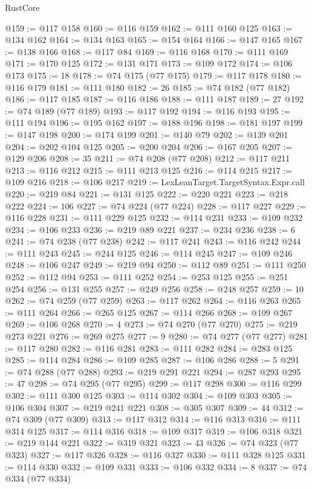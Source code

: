 \begin{lexlean}{RustCore}
\begin{coremodule}
@159 := @117 @158
@160 := @116 @159
@162 := @111 @160 @125
@163 := @134 @162
@164 := @134 @163
@165 := @154 @164
@166 := @147 @165
@167 := @138 @166
@168 := @117 @84
@169 := @116 @168
@170 := @111 @169
@171 := @170 @125
@172 := @131 @171
@173 := @109 @172
@174 := @106 @173
@175 := 18
@178 := @74 @175 (@77 @175)
@179 := @117 @178
@180 := @116 @179
@181 := @111 @180
@182 := 26
@185 := @74 @182 (@77 @182)
@186 := @117 @185
@187 := @116 @186
@188 := @111 @187
@189 := 27
@192 := @74 @189 (@77 @189)
@193 := @117 @192
@194 := @116 @193
@195 := @111 @194
@196 := @195 @162
@197 := @188 @196
@198 := @181 @197
@199 := @147 @198
@200 := @174 @199
@201 := @140 @79
@202 := @139 @201
@204 := @202 @104 @125
@205 := @200 @204
@206 := @167 @205
@207 := @129 @206
@208 := 35
@211 := @74 @208 (@77 @208)
@212 := @117 @211
@213 := @116 @212
@215 := @111 @213 @125
@216 := @114 @215
@217 := @109 @216
@218 := @106 @217
@219 := LexLeanTarget.TargetSyntax.Expr.call
@220 := @219 @84
@221 := @131 @125
@222 := @220 @221
@223 := @218 @222
@224 := 106
@227 := @74 @224 (@77 @224)
@228 := @117 @227
@229 := @116 @228
@231 := @111 @229 @125
@232 := @114 @231
@233 := @109 @232
@234 := @106 @233
@236 := @219 @89 @221
@237 := @234 @236
@238 := 6
@241 := @74 @238 (@77 @238)
@242 := @117 @241
@243 := @116 @242
@244 := @111 @243
@245 := @244 @125
@246 := @114 @245
@247 := @109 @246
@248 := @106 @247
@249 := @219 @94
@250 := @112 @89
@251 := @111 @250
@252 := @112 @94
@253 := @111 @252
@254 := @253 @125
@255 := @251 @254
@256 := @131 @255
@257 := @249 @256
@258 := @248 @257
@259 := 10
@262 := @74 @259 (@77 @259)
@263 := @117 @262
@264 := @116 @263
@265 := @111 @264
@266 := @265 @125
@267 := @114 @266
@268 := @109 @267
@269 := @106 @268
@270 := 4
@273 := @74 @270 (@77 @270)
@275 := @219 @273 @221
@276 := @269 @275
@277 := 9
@280 := @74 @277 (@77 @277)
@281 := @117 @280
@282 := @116 @281
@283 := @111 @282
@284 := @283 @125
@285 := @114 @284
@286 := @109 @285
@287 := @106 @286
@288 := 5
@291 := @74 @288 (@77 @288)
@293 := @219 @291 @221
@294 := @287 @293
@295 := 47
@298 := @74 @295 (@77 @295)
@299 := @117 @298
@300 := @116 @299
@302 := @111 @300 @125
@303 := @114 @302
@304 := @109 @303
@305 := @106 @304
@307 := @219 @241 @221
@308 := @305 @307
@309 := 44
@312 := @74 @309 (@77 @309)
@313 := @117 @312
@314 := @116 @313
@316 := @111 @314 @125
@317 := @114 @316
@318 := @109 @317
@319 := @106 @318
@321 := @219 @144 @221
@322 := @319 @321
@323 := 43
@326 := @74 @323 (@77 @323)
@327 := @117 @326
@328 := @116 @327
@330 := @111 @328 @125
@331 := @114 @330
@332 := @109 @331
@333 := @106 @332
@334 := 8
@337 := @74 @334 (@77 @334)

\end{coremodule}
\end{lexlean}
